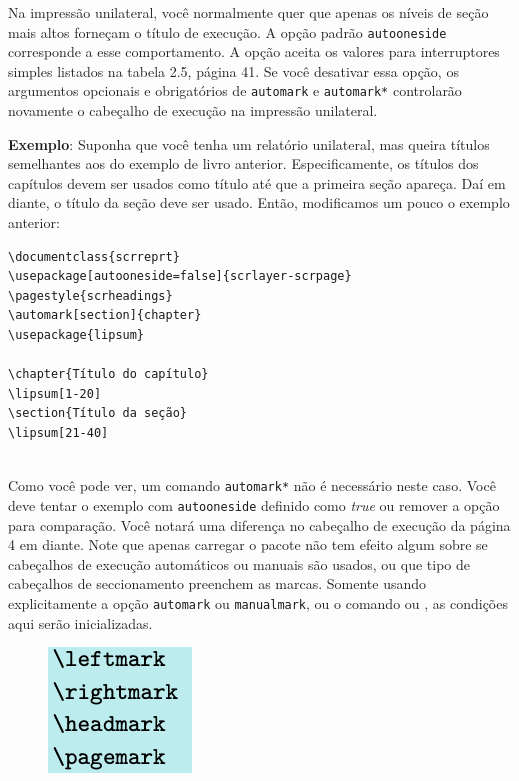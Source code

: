 Na impressão unilateral, você normalmente quer que apenas os níveis de seção mais altos forneçam o título de execução. A opção padrão \texttt{autooneside} corresponde a esse comportamento. A opção aceita os valores para interruptores simples listados na tabela 2.5, página 41. Se você desativar essa opção, os argumentos opcionais e obrigatórios de \texttt{automark} e \texttt{automark*} controlarão novamente o cabeçalho de execução na impressão unilateral.

\textbf{Exemplo}: Suponha que você tenha um relatório unilateral, mas queira títulos semelhantes aos do exemplo de livro anterior. Especificamente, os títulos dos capítulos devem ser usados como título até que a primeira seção apareça. Daí em diante, o título da seção deve ser usado. Então, modificamos um pouco o exemplo anterior:
\begin{verbatim}
\documentclass{scrreprt}
\usepackage[autooneside=false]{scrlayer-scrpage}
\pagestyle{scrheadings}
\automark[section]{chapter}
\usepackage{lipsum}

\chapter{Título do capítulo}
\lipsum[1-20]
\section{Título da seção}
\lipsum[21-40]
    
\end{verbatim}

Como você pode ver, um comando \texttt{automark*} não é necessário neste caso. Você deve tentar o exemplo com \texttt{autooneside} definido como \textit{true} ou remover a opção para comparação. Você notará uma diferença no cabeçalho de execução da página 4 em diante.
Note que apenas carregar o pacote não tem efeito algum sobre se cabeçalhos de execução automáticos ou manuais são usados, ou que tipo de cabeçalhos de seccionamento preenchem as marcas. Somente usando explicitamente a opção \texttt{automark} ou \texttt{manualmark}, ou o comando  ou , as condições aqui serão inicializadas.

\begin{figure}[h]
     \includegraphics[width=0.2\linewidth]{imagens/imagem08.png}
\end{figure}

